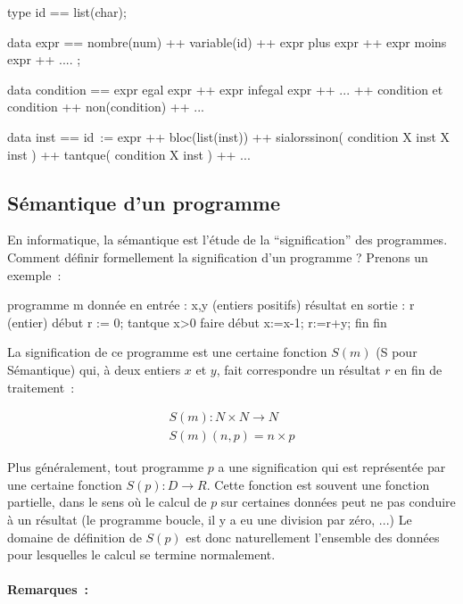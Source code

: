 \begin{verbatimtab}
type id	 	== list(char);

data expr 	== nombre(num)
		++ variable(id)
		++ expr plus expr
		++ expr moins expr
		++ .... ;

data condition	== expr egal expr
		++ expr infegal expr
		++ ...
		++ condition et condition
		++ non(condition)
		++ ...
			
data inst	== id~:= expr
		++ bloc(list(inst))
		++ sialorssinon( condition X inst X inst )
		++ tantque( condition X inst )
		++ ... 

\end{verbatimtab}

\subsection{Sémantique d'un programme}

En informatique, la sémantique est l'étude de la ``signification'' des
programmes. Comment définir formellement la signification d'un
programme ? Prenons un exemple~:

\begin{verbatimtab}
programme m
donnée en entrée : x,y (entiers positifs)
résultat en sortie : r (entier)
début
     r := 0;
     tantque x>0 faire 
          début 
               x:=x-1; 
               r:=r+y; 
          fin
fin
\end{verbatimtab}

La signification de ce programme est  une certaine
fonction $S(m)$ (S pour Sémantique) qui, à deux entiers $x$ et $y$, fait
correspondre un résultat $r$ en fin de traitement~:

$$\begin{array}{l}
               S(m): N \times N \rightarrow N \\
               S(m)(n,p) = n \times p
\end{array}$$

Plus généralement, tout programme $p$ a une signification qui est
représentée par une certaine fonction $S(p) : D \rightarrow R$. Cette fonction
est souvent une fonction partielle, dans le sens o\`u le calcul de $p$
sur certaines données peut ne pas conduire à un résultat (le programme
boucle, il y a eu une division par zéro, ...) Le domaine de
définition de $S(p)$ est donc naturellement l'ensemble des données pour
lesquelles le calcul se termine normalement.


\paragraph{Remarques~:}

